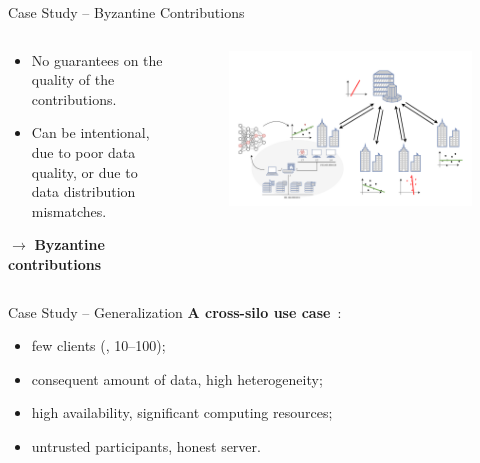 \begin{frame}{Case Study -- Byzantine Contributions}
\begin{columns}
    \begin{column}{0.4\textwidth}
      \begin{itemize}
        \item No guarantees on the quality of the contributions.
        \item Can be intentional, due to poor data quality, or due to data distribution mismatches.
      \end{itemize}
      
      $\rightarrow$ \textbf{Byzantine contributions}
    \end{column}
    
    \begin{column}{0.6\textwidth}
      \begin{figure}
        \centering
        \includegraphics[width=1.1\linewidth,right]{figures/intro/poisoning.drawio.pdf}
      \end{figure}
    \end{column}
  \end{columns}
\end{frame}

\begin{frame}{Case Study -- Generalization}
  \textbf{A cross-silo use case}~\cite{kairouz_AdvancesOpenProblems_2021}:
  \begin{itemize}
    \item few clients (\ie, 10--100);
    \item consequent amount of data, high heterogeneity;
    \item high availability, significant computing resources;
    \item untrusted participants, honest server.
  \end{itemize}
\end{frame}

